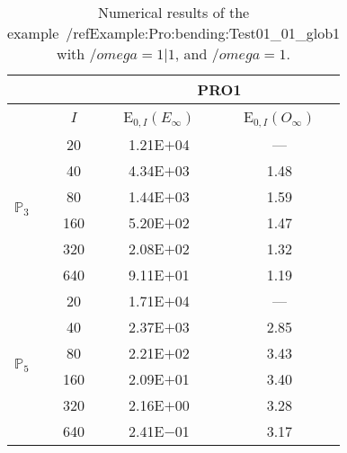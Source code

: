 \begin{table}[H]
\caption{Numerical results of the example~/ref{Example:Pro:bending:Test01_01_glob1} with $/omega=1|1$, and $/omega=1$.}
\setlength{\tabcolsep}{5pt}
\centering
\begin{tabular}{@{}l c c c@{}}
\toprule
 &  & \multicolumn{2}{c}{PRO1}\\
\midrule
 & $I$ & E$_{0,I}(E_{\infty})$ & E$_{0,I}(O_{\infty})$\\
\midrule
\multirow{6}{*}{$\mathbb{P}_{3}$}
 & 20 & 1.21E$+$04 & ---\\
 & 40 & 4.34E$+$03 & 1.48\\
 & 80 & 1.44E$+$03 & 1.59\\
 & 160 & 5.20E$+$02 & 1.47\\
 & 320 & 2.08E$+$02 & 1.32\\
 & 640 & 9.11E$+$01 & 1.19\\
\midrule
\multirow{6}{*}{$\mathbb{P}_{5}$}
 & 20 & 1.71E$+$04 & ---\\
 & 40 & 2.37E$+$03 & 2.85\\
 & 80 & 2.21E$+$02 & 3.43\\
 & 160 & 2.09E$+$01 & 3.40\\
 & 320 & 2.16E$+$00 & 3.28\\
 & 640 & 2.41E$-$01 & 3.17\\
\bottomrule
\end{tabular}
\label{Table:PRO:test_01_01_test23_pro1}
\end{table}
